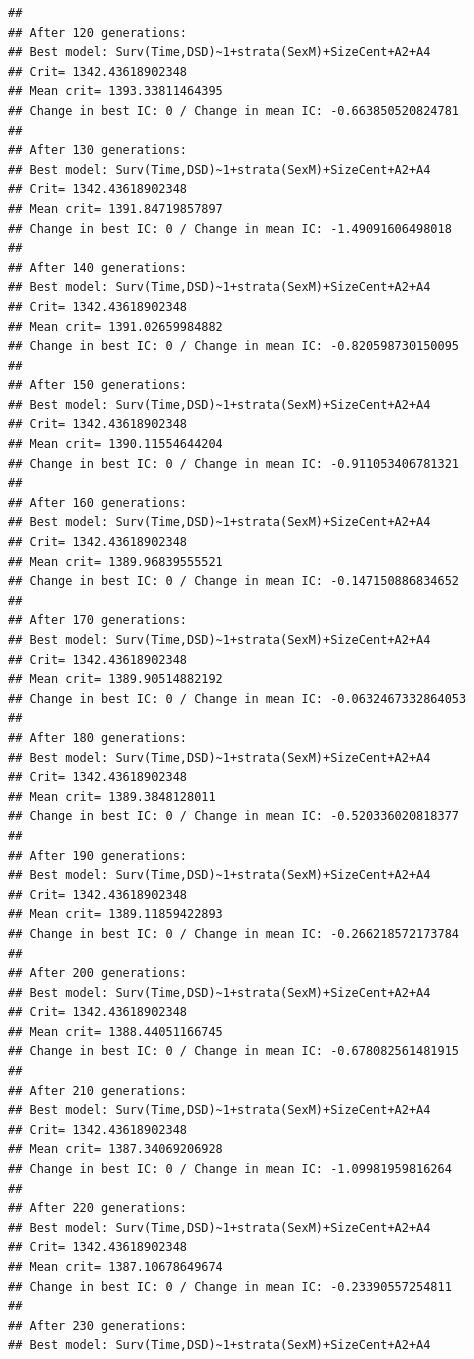\documentclass{article}\usepackage[]{graphicx}\usepackage[]{color}
\makeatletter
\newenvironment{kframe}{%
 \def\at@end@of@kframe{}%
 \ifinner\ifhmode%
  \def\at@end@of@kframe{\end{minipage}}%
  \begin{minipage}{\columnwidth}%
 \fi\fi%
 \def\FrameCommand##1{\hskip\@totalleftmargin \hskip-\fboxsep
 \colorbox{shadecolor}{##1}\hskip-\fboxsep
     \hskip-\linewidth \hskip-\@totalleftmargin \hskip\columnwidth}%
 \MakeFramed {\advance\hsize-\width
   \@totalleftmargin\z@ \linewidth\hsize
   \@setminipage}}%
 {\par\unskip\endMakeFramed%
 \at@end@of@kframe}
\newenvironment{knitrout}{}{} %
\makeatother
\begin{document}
\begin{knitrout}
\begin{kframe}
{\ttfamily\noindent\color{warningcolor}{\#\# Warning in fitter(X, Y, strats, offset, init, control, weights = weights, : Loglik converged before variable\ \ 11 ; beta may be infinite.}}\begin{verbatim}
## 
## After 120 generations:
## Best model: Surv(Time,DSD)~1+strata(SexM)+SizeCent+A2+A4
## Crit= 1342.43618902348
## Mean crit= 1393.33811464395
## Change in best IC: 0 / Change in mean IC: -0.663850520824781
## 
## After 130 generations:
## Best model: Surv(Time,DSD)~1+strata(SexM)+SizeCent+A2+A4
## Crit= 1342.43618902348
## Mean crit= 1391.84719857897
## Change in best IC: 0 / Change in mean IC: -1.49091606498018
## 
## After 140 generations:
## Best model: Surv(Time,DSD)~1+strata(SexM)+SizeCent+A2+A4
## Crit= 1342.43618902348
## Mean crit= 1391.02659984882
## Change in best IC: 0 / Change in mean IC: -0.820598730150095
## 
## After 150 generations:
## Best model: Surv(Time,DSD)~1+strata(SexM)+SizeCent+A2+A4
## Crit= 1342.43618902348
## Mean crit= 1390.11554644204
## Change in best IC: 0 / Change in mean IC: -0.911053406781321
## 
## After 160 generations:
## Best model: Surv(Time,DSD)~1+strata(SexM)+SizeCent+A2+A4
## Crit= 1342.43618902348
## Mean crit= 1389.96839555521
## Change in best IC: 0 / Change in mean IC: -0.147150886834652
## 
## After 170 generations:
## Best model: Surv(Time,DSD)~1+strata(SexM)+SizeCent+A2+A4
## Crit= 1342.43618902348
## Mean crit= 1389.90514882192
## Change in best IC: 0 / Change in mean IC: -0.0632467332864053
## 
## After 180 generations:
## Best model: Surv(Time,DSD)~1+strata(SexM)+SizeCent+A2+A4
## Crit= 1342.43618902348
## Mean crit= 1389.3848128011
## Change in best IC: 0 / Change in mean IC: -0.520336020818377
## 
## After 190 generations:
## Best model: Surv(Time,DSD)~1+strata(SexM)+SizeCent+A2+A4
## Crit= 1342.43618902348
## Mean crit= 1389.11859422893
## Change in best IC: 0 / Change in mean IC: -0.266218572173784
## 
## After 200 generations:
## Best model: Surv(Time,DSD)~1+strata(SexM)+SizeCent+A2+A4
## Crit= 1342.43618902348
## Mean crit= 1388.44051166745
## Change in best IC: 0 / Change in mean IC: -0.678082561481915
## 
## After 210 generations:
## Best model: Surv(Time,DSD)~1+strata(SexM)+SizeCent+A2+A4
## Crit= 1342.43618902348
## Mean crit= 1387.34069206928
## Change in best IC: 0 / Change in mean IC: -1.09981959816264
## 
## After 220 generations:
## Best model: Surv(Time,DSD)~1+strata(SexM)+SizeCent+A2+A4
## Crit= 1342.43618902348
## Mean crit= 1387.10678649674
## Change in best IC: 0 / Change in mean IC: -0.23390557254811
## 
## After 230 generations:
## Best model: Surv(Time,DSD)~1+strata(SexM)+SizeCent+A2+A4

\end{verbatim}
\end{kframe}
\end{knitrout}
\end{document}
